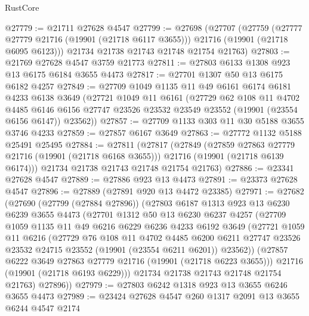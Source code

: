 \begin{lexlean}{RustCore}
\begin{coremodule}
@27779 := @21711 @27628 @4547
@27799 := @27698
    (@27707
      (@27759
        (@27777 @27779 @21716 (@19901 (@21718 @6117 @3655)))
        @21716
        (@19901 (@21718 @6095 @6123)))
      @21734
      @21738
      @21743
      @21748
      @21754
      @21763)
@27803 := @21769 @27628 @4547 @3759 @21773
@27811 := @27803 @6133 @1308 @923 @13 @6175 @6184 @3655 @4473
@27817 := @27701 @1307 @50 @13 @6175 @6182 @4257
@27849 := @27709
    @1049
    @1135
    @11
    @49
    @6161
    @6174
    @6181
    @4233
    @6138
    @3649
    (@27721
      @1049
      @11
      @6161
      (@27729
        @62
        @108
        @11
        @4702
        @4485
        @6146
        @6156
        @27747
        @23526
        @23532
        @23549
        @23552
        (@19901 (@23554 @6156 @6147))
        @23562))
@27857 := @27709 @1133 @303 @11 @30 @5188 @3655 @3746 @4233
@27859 := @27857 @6167 @3649
@27863 := @27772 @1132 @5188 @25491 @25495
@27884 := @27811
    (@27817
      (@27849
        (@27859 @27863 @27779 @21716 (@19901 (@21718 @6168 @3655)))
        @21716
        (@19901 (@21718 @6139 @6174)))
      @21734
      @21738
      @21743
      @21748
      @21754
      @21763)
@27886 := @23341 @27628 @4547
@27889 := @27886 @923 @13 @4473
@27891 := @23373 @27628 @4547
@27896 := @27889 (@27891 @920 @13 @4472 @23385)
@27971 := @27682
    (@27690
      (@27799 (@27884 @27896))
      (@27803
        @6187
        @1313
        @923
        @13
        @6230
        @6239
        @3655
        @4473
        (@27701
          @1312
          @50
          @13
          @6230
          @6237
          @4257
          (@27709
            @1059
            @1135
            @11
            @49
            @6216
            @6229
            @6236
            @4233
            @6192
            @3649
            (@27721
              @1059
              @11
              @6216
              (@27729
                @76
                @108
                @11
                @4702
                @4485
                @6200
                @6211
                @27747
                @23526
                @23532
                @24715
                @23552
                (@19901 (@23554 @6211 @6201))
                @23562))
            (@27857 @6222 @3649 @27863 @27779 @21716 (@19901 (@21718 @6223 @3655)))
            @21716
            (@19901 (@21718 @6193 @6229)))
          @21734
          @21738
          @21743
          @21748
          @21754
          @21763)
        @27896))
@27979 := @27803 @6242 @1318 @923 @13 @3655 @6246 @3655 @4473
@27989 := @23424 @27628 @4547 @260 @1317 @2091 @13 @3655 @6244 @4547 @2174

\end{coremodule}
\end{lexlean}
